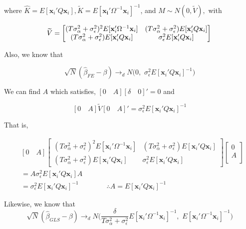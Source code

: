 \documentclass[12pt]{article}
\begin{document}
where $ \widehat{K} = E[\mathbf{x}_i' Q \mathbf{x}_i],  \widetilde{K}=E[\mathbf{x_i}' \Omega^{-1} \mathbf{x}_i]^{-1}$, and $M \sim N(0, \widetilde{V}),$ with

\[
\widetilde{V} =  \begin{bmatrix}
(T\sigma_\alpha^2 + \sigma_\epsilon^2)^2 E[\mathbf{x}_i' \Omega^{-1} \mathbf{x}_i] & (T\sigma_\alpha^2 + \sigma_\epsilon^2) E[\mathbf{x}_i' Q \mathbf{x}_i] \\
 (T\sigma_\alpha^2 + \sigma_\epsilon^2) E[\mathbf{x}_i' Q \mathbf{x}_i] & \sigma_\epsilon^2 E[\mathbf{x}_i' Q \mathbf{x}_i]
\end{bmatrix} \\
\]

Also, we know that

\[
\sqrt{N} (\widehat{\beta}_{FE}-\beta) \rightarrow_{d} N\big(0,\,\, \sigma_\epsilon^2 E[\mathbf{x}_i' Q \mathbf{x}_i]^{-1}\big)
\]

We can find $A$ which satisfies, $[0 \quad A][\delta \quad 0]' = 0$ and 

\[
[0 \quad A] \widetilde{V} [0 \quad A]' = \sigma_\epsilon^2 E[\mathbf{x}_i' Q \mathbf{x}_i]^{-1}
\]

That is,

\begin{align*}
&[0 \quad A]  \begin{bmatrix}
(T\sigma_\alpha^2 + \sigma_\epsilon^2)^2 E[\mathbf{x}_i' \Omega^{-1} \mathbf{x}_i] & (T\sigma_\alpha^2 + \sigma_\epsilon^2) E[\mathbf{x}_i' Q \mathbf{x}_i] \\
 (T\sigma_\alpha^2 + \sigma_\epsilon^2) E[\mathbf{x}_i' Q \mathbf{x}_i] & \sigma_\epsilon^2 E[\mathbf{x}_i' Q \mathbf{x}_i]
\end{bmatrix} \begin{bmatrix}
0\\
A\\
\end{bmatrix} \\ & = A \sigma_\epsilon^2 E[\mathbf{x}_i' Q \mathbf{x}_i] A\\ &= \sigma_\epsilon^2 E[\mathbf{x}_i' Q \mathbf{x}_i]^{-1} \qquad \qquad \therefore A= E[\mathbf{x}_i' Q \mathbf{x}_i]^{-1}
\end{align*}

Likewise, we know that
\[
\sqrt{N} (\widehat{\beta}_{GLS}-\beta) \rightarrow_{d} N\big( \frac{\delta}{T\sigma_\alpha^2 + \sigma_\epsilon^2}  E[\mathbf{x}_i' \Omega^{-1} \mathbf{x}_i]^{-1},\,\, E[\mathbf{x}_i' \Omega^{-1} \mathbf{x}_i]^{-1}\big)
\]
\end{document}
